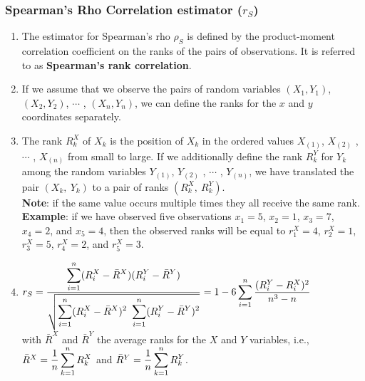 \subsubsection{Spearman’s Rho Correlation estimator ($r_S$)}

\begin{enumerate}
    \item The estimator for Spearman’s rho $\rho_S$ is defined by the product-moment correlation coefficient on the ranks of the pairs of observations. 
    It is referred to as \textbf{Spearman’s rank correlation}.
    \hfill \cite{statistics/book/Statistics-for-Data-Scientists/Maurits-Kaptein}

    \item If we assume that we observe the pairs of random variables $(X_1, Y_1)$, $(X_2, Y_2)$, $\cdots$ , $(X_n , Y_n )$, we can define the ranks for the $x$ and $y$ coordinates separately.
    \hfill \cite{statistics/book/Statistics-for-Data-Scientists/Maurits-Kaptein}

    \item The rank $R^X_k$ of $X_k$ is the position of $X_k$ in the ordered values $X_{(1)}$, $X_{(2)}$ , $\cdots$ , $X_{(n)}$ from small to large. 
    If we additionally define the rank $R^Y_k$ for $Y_k$ among the random variables $Y_{(1)}$, $Y_{(2)}$ , $\cdots$ , $Y_{(n)}$, we have translated the pair $(X_k ,\ Y_k )$ to a pair of ranks $(R^X_k ,\ R^Y_k )$.
    \hfill \cite{statistics/book/Statistics-for-Data-Scientists/Maurits-Kaptein}
    \\
    \textbf{Note}: if the same value occurs multiple times they all receive the same rank.
    \hfill \cite{statistics/book/Statistics-for-Data-Scientists/Maurits-Kaptein}
    \\
    \textbf{Example}: if we have observed five observations $x_1 = 5$, $x_2 = 1$, $x_3 = 7$, $x_4 = 2$, and $x_5 = 4$, then the observed ranks will be equal to $r^X_1 = 4$, $r^X_2 = 1$, $r^X_3 = 5$, $r^X_4 = 2$, and $r^X_5 = 3$.
    \hfill \cite{statistics/book/Statistics-for-Data-Scientists/Maurits-Kaptein}

    \item 
    $
        r_S 
        = \dfrac{\displaystyle\sum^n_{i=1} (R^X_i - \bar{R}^X )(R^Y_i - \bar{R}^Y )}{
            \sqrt{\displaystyle\sum^n_{i=1} (R^X_i - \bar{R}^X )^2\ \displaystyle\sum^n_{i=1} (R^Y_i - \bar{R}^Y )^2}
        }
        = 1 - 6 \displaystyle\sum^n_{i=1} \dfrac{(R^Y_i - R^X_i)^2}{n^3 - n}
    $
    \hfill \cite{statistics/book/Statistics-for-Data-Scientists/Maurits-Kaptein}
    \\[0.3cm]
    with $\bar{R}^X$ and $\bar{R}^Y$ the average ranks for the $X$ and $Y$ variables, i.e., $\bar{R}^X = \dfrac{1}{n} \displaystyle\sum^n_{k=1} R^X_k$ and $\bar{R}^Y = \dfrac{1}{n} \displaystyle\sum^n_{k=1}  R^Y_k$. 
    \hfill \cite{statistics/book/Statistics-for-Data-Scientists/Maurits-Kaptein}


\end{enumerate}
